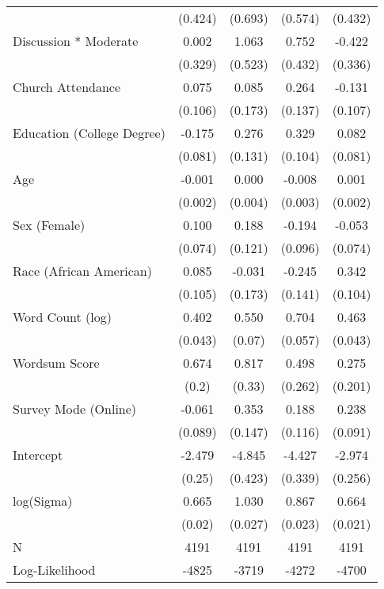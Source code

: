 \begin{table}[ht]
\begin{tabular}{lcccc}
   & (0.424) & (0.693) & (0.574) & (0.432) \\ 
  Discussion * Moderate &  0.002 &  1.063 &  0.752 & -0.422 \\ 
   & (0.329) & (0.523) & (0.432) & (0.336) \\ 
  Church Attendance &  0.075 &  0.085 &  0.264 & -0.131 \\ 
   & (0.106) & (0.173) & (0.137) & (0.107) \\ 
  Education (College Degree) & -0.175 &  0.276 &  0.329 &  0.082 \\ 
   & (0.081) & (0.131) & (0.104) & (0.081) \\ 
  Age & -0.001 &  0.000 & -0.008 &  0.001 \\ 
   & (0.002) & (0.004) & (0.003) & (0.002) \\ 
  Sex (Female) &  0.100 &  0.188 & -0.194 & -0.053 \\ 
   & (0.074) & (0.121) & (0.096) & (0.074) \\ 
  Race (African American) &  0.085 & -0.031 & -0.245 &  0.342 \\ 
   & (0.105) & (0.173) & (0.141) & (0.104) \\ 
  Word Count (log) &  0.402 &  0.550 &  0.704 &  0.463 \\ 
   & (0.043) & (0.07) & (0.057) & (0.043) \\ 
  Wordsum Score &  0.674 &  0.817 &  0.498 &  0.275 \\ 
   & (0.2) & (0.33) & (0.262) & (0.201) \\ 
  Survey Mode (Online) & -0.061 &  0.353 &  0.188 &  0.238 \\ 
   & (0.089) & (0.147) & (0.116) & (0.091) \\ 
  Intercept & -2.479 & -4.845 & -4.427 & -2.974 \\ 
   & (0.25) & (0.423) & (0.339) & (0.256) \\ 
  log(Sigma) &  0.665 &  1.030 &  0.867 &  0.664 \\ 
   & (0.02) & (0.027) & (0.023) & (0.021) \\ 
   \hline
N & 4191 & 4191 & 4191 & 4191 \\ 
  Log-Likelihood & -4825 & -3719 & -4272 & -4700 \\ 
   \hline
\end{tabular}
\endgroup
\end{table}
